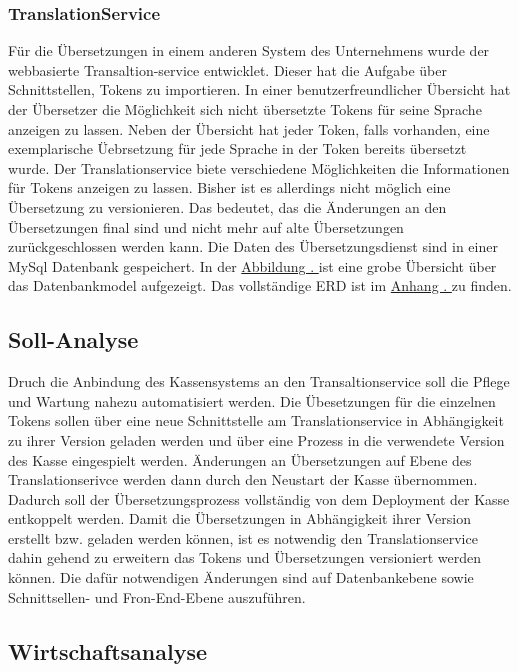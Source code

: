 \documentclass[10pt, oneside]{article}
\newcommand{\figsecref}[1]{\hyperref[{#1}]{Abbildung \thesubsection. \nameref*{#1}}}
\newcommand{\attsecref}[1]{\hyperref[{#1}]{Anhang \thesubsection. \nameref*{#1}}}
\begin{document}
  \subsubsection{TranslationService}\label{sec:analyse:current:ts}%
    Für die Übersetzungen in einem anderen System des Unternehmens wurde der webbasierte Transaltion-service entwicklet. 
    Dieser hat die Aufgabe über Schnittstellen, Tokens zu importieren.
    In einer benutzerfreundlicher Übersicht hat der Übersetzer die Möglichkeit sich nicht übersetzte Tokens für seine Sprache anzeigen zu lassen.
    Neben der Übersicht hat jeder Token, falls vorhanden, eine exemplarische Üebrsetzung für jede Sprache in der Token bereits übersetzt wurde.
    Der Translationservice biete verschiedene Möglichkeiten die Informationen für Tokens anzeigen zu lassen. 
    Bisher ist es allerdings nicht möglich eine Übersetzung zu versionieren. Das bedeutet, das die Änderungen an den Übersetzungen final sind und nicht 
    mehr auf alte Übersetzungen zurückgeschlossen werden kann.
    Die Daten des Übersetzungsdienst sind in einer MySql Datenbank gespeichert. In der \figsecref{abb:erdIs1} ist eine grobe Übersicht über das Datenbankmodel aufgezeigt. 
    Das vollständige ERD ist im \attsecref{sec:erd:is} zu finden.
  
  \subsection{Soll-Analyse}%
    Druch die Anbindung des Kassensystems an den Transaltionservice soll die Pflege und Wartung nahezu automatisiert werden. 
    Die Übesetzungen für die einzelnen Tokens sollen über eine neue Schnittstelle am Translationservice in Abhängigkeit zu ihrer Version geladen werden 
    und über eine Prozess in die verwendete Version des Kasse eingespielt werden. Änderungen an Übersetzungen auf Ebene des Translationserivce werden dann
    durch den Neustart der Kasse übernommen. Dadurch soll der Übersetzungsprozess vollständig von dem Deployment der Kasse entkoppelt werden.
    Damit die Übersetzungen in Abhängigkeit ihrer Version erstellt bzw. geladen werden können, ist es notwendig den Translationservice dahin gehend zu erweitern
    das Tokens und Übersetzungen versioniert werden können. Die dafür notwendigen Änderungen sind auf Datenbankebene sowie Schnittsellen- und Fron-End-Ebene auszuführen.
  \subsection{Wirtschaftsanalyse}
\end{document}

